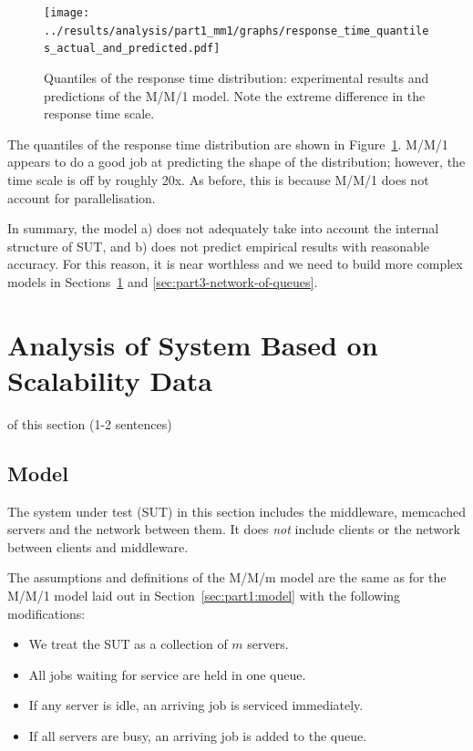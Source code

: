 \documentclass[11pt]{article}
\newcommand{\todo}[1]{\fcolorbox{black}{Apricot}{TODO: #1}}
\begin{document}
\begin{figure}[h]
\texttt{[image: ../results/analysis/part1\_mm1/graphs/response\_time\_quantiles\_actual\_and\_predicted.pdf]}
\caption{Quantiles of the response time distribution: experimental results and predictions of the M/M/1 model. Note the extreme difference in the response time scale.}
\label{fig:part1:quantiles_responsetime}
\end{figure}


The quantiles of the response time distribution are shown in Figure~\ref{fig:part1:quantiles_responsetime}. M/M/1 appears to do a good job at predicting the shape of the distribution; however, the time scale is off by roughly 20x. As before, this is because M/M/1 does not account for parallelisation.

In summary, the model a) does not adequately take into account the internal structure of SUT, and b) does not predict empirical results with reasonable accuracy. For this reason, it is near worthless and we need to build more complex models in Sections~\ref{sec:part2-analysis-scalability} and \ref{sec:part3-network-of-queues}.

\clearpage
\section{Analysis of System Based on Scalability Data}\label{sec:part2-analysis-scalability}

\todo{Purpose} of this section (1-2 sentences)

\subsection{Model}

The system under test (SUT) in this section includes the middleware, memcached servers and the network between them. It does \emph{not} include clients or the network between clients and middleware.

The assumptions and definitions of the M/M/m model are the same as for the M/M/1 model laid out in Section~\ref{sec:part1:model} with the following modifications:

\begin{itemize}
	\item We treat the SUT as a collection of $m$ servers.
	\item All jobs waiting for service are held in one queue.
	\item If any server is idle, an arriving job is serviced immediately.
	\item If all servers are busy, an arriving job is added to the queue.
\end{itemize}
\end{document}

